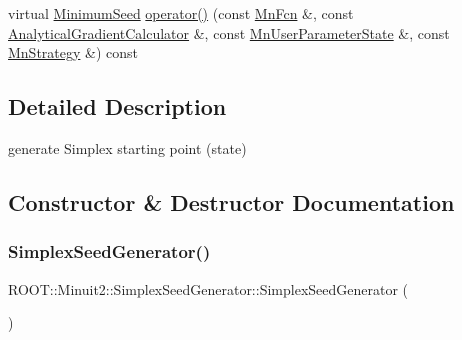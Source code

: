 \begin{DoxyCompactItemize}
\item 
virtual \mbox{\hyperlink{classROOT_1_1Minuit2_1_1MinimumSeed}{Minimum\+Seed}} \mbox{\hyperlink{classROOT_1_1Minuit2_1_1SimplexSeedGenerator_a483dc9272be849a23bcd0d29ac4e3b94}{operator()}} (const \mbox{\hyperlink{classROOT_1_1Minuit2_1_1MnFcn}{Mn\+Fcn}} \&, const \mbox{\hyperlink{classROOT_1_1Minuit2_1_1AnalyticalGradientCalculator}{Analytical\+Gradient\+Calculator}} \&, const \mbox{\hyperlink{classROOT_1_1Minuit2_1_1MnUserParameterState}{Mn\+User\+Parameter\+State}} \&, const \mbox{\hyperlink{classROOT_1_1Minuit2_1_1MnStrategy}{Mn\+Strategy}} \&) const
\end{DoxyCompactItemize}


\subsection{Detailed Description}
generate Simplex starting point (state) 

\subsection{Constructor \& Destructor Documentation}
\mbox{\label{classROOT_1_1Minuit2_1_1SimplexSeedGenerator_a87fe66f9acb29b55da8d457cd761b1af}} 
\subsubsection{\texorpdfstring{SimplexSeedGenerator()}{SimplexSeedGenerator()}\hspace{0.1cm}{\footnotesize\ttfamily [1/2]}}
{\footnotesize\ttfamily R\+O\+O\+T\+::\+Minuit2\+::\+Simplex\+Seed\+Generator\+::\+Simplex\+Seed\+Generator (\begin{DoxyParamCaption}{ }\end{DoxyParamCaption})\hspace{0.3cm}{\ttfamily [inline]}}

\mbox{\label{classROOT_1_1Minuit2_1_1SimplexSeedGenerator_a2b791925969c5bfb1f427b978a277e25}} 
